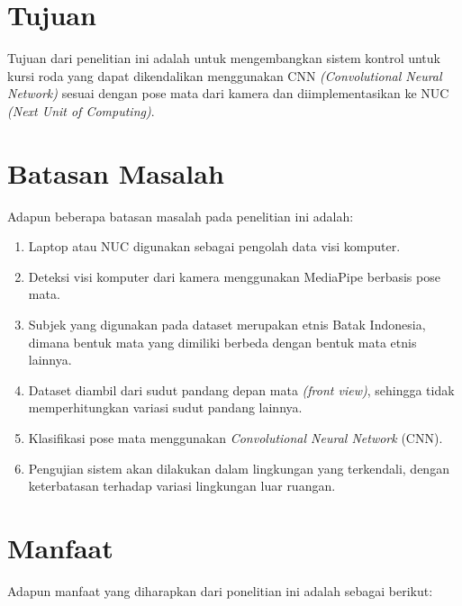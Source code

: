 \section{Tujuan}
\label{sec:Tujuan}

Tujuan dari penelitian ini adalah untuk mengembangkan sistem kontrol untuk kursi roda yang dapat dikendalikan menggunakan CNN \emph{(Convolutional Neural Network)} sesuai dengan pose mata dari kamera dan diimplementasikan ke NUC \textit{(Next Unit of Computing)}.

\section{Batasan Masalah}
\label{sec:batasanmasalah}

Adapun beberapa batasan masalah pada penelitian ini adalah:

\begin{enumerate}[nolistsep]

  \item Laptop atau NUC digunakan sebagai pengolah data visi komputer.
  
  \item Deteksi visi komputer dari kamera menggunakan MediaPipe berbasis pose mata.

  \item Subjek yang digunakan pada dataset merupakan etnis Batak Indonesia, dimana bentuk mata yang dimiliki berbeda dengan bentuk mata etnis lainnya.
  
  \item Dataset diambil dari sudut pandang depan mata \emph{(front view)}, sehingga tidak memperhitungkan variasi sudut pandang lainnya.

  \item Klasifikasi pose mata menggunakan \emph{Convolutional Neural Network} (CNN).

  \item Pengujian sistem akan dilakukan dalam lingkungan yang terkendali, dengan keterbatasan terhadap variasi lingkungan luar ruangan.

\end{enumerate}

\section{Manfaat}


Adapun manfaat yang diharapkan dari ponelitian ini adalah sebagai berikut:

